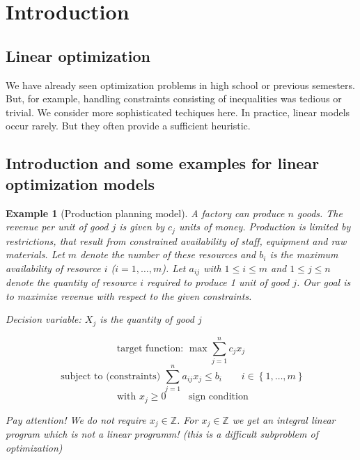 \documentclass[a4paper]{article}
\numberwithin{lecref}{subsection}
\newcounter{exercises}
\newtheorem{example}[exercises]{Example}
\newcommand{\Set}[1]{\left\{#1\right\}}
\begin{document}
\section{Introduction}
\subsection{Linear optimization}

We have already seen optimization problems in high school or previous semesters.
But, for example, handling constraints consisting of inequalities was tedious or trivial.
We consider more sophisticated techiques here.
In practice, linear models occur rarely. But they often provide a sufficient heuristic.

\subsection{Introduction and some examples for linear optimization models}

\begin{example}[Production planning model]
	\label{example:1}
	A factory can produce $n$ goods.
	The revenue per unit of good $j$ is given by $c_j$ units of money.
	Production is limited by restrictions, that result from constrained availability of staff, equipment and raw materials.
	Let $m$ denote the number of these resources and $b_i$ is the maximum availability of resource $i$ ($i = 1, \dots, m$).
	Let $a_{ij}$ with $1 \leq i \leq m$ and $1 \leq j \leq n$ denote the quantity of resource $i$ required to produce 1 unit of good $j$.
	Our goal is to maximize revenue with respect to the given constraints.

	\emph{Decision variable:} $X_j$ is the quantity of good $j$

	\[ \text{target function: } \max \sum_{j=1}^n c_j x_j \]
	\[ \text{ subject to (constraints) } \sum_{j=1}^n a_{ij} x_j \leq b_i \qquad i \in \Set{1, \dots, m} \]
	\[ \text{ with } x_j \geq 0 \qquad \text{ sign condition} \]

	Pay attention! We do not require $x_j \in \mathbb Z$. For $x_j \in \mathbb Z$ we get an integral linear program which is \emph{not} a linear programm! (this is a difficult subproblem of optimization)
\end{example}
\end{document}
